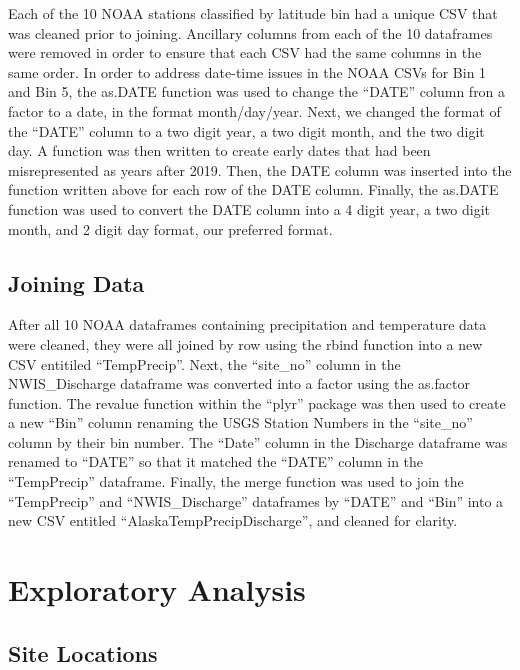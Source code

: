\documentclass[12pt,]{article}
\begin{document}
Each of the 10 NOAA stations classified by latitude bin had a unique CSV
that was cleaned prior to joining. Ancillary columns from each of the 10
dataframes were removed in order to ensure that each CSV had the same
columns in the same order. In order to address date-time issues in the
NOAA CSVs for Bin 1 and Bin 5, the as.DATE function was used to change
the ``DATE'' column fron a factor to a date, in the format
month/day/year. Next, we changed the format of the ``DATE'' column to a
two digit year, a two digit month, and the two digit day. A function was
then written to create early dates that had been misrepresented as years
after 2019. Then, the DATE column was inserted into the function written
above for each row of the DATE column. Finally, the as.DATE function was
used to convert the DATE column into a 4 digit year, a two digit month,
and 2 digit day format, our preferred format.

\hypertarget{joining-data}{%
\subsection{Joining Data}\label{joining-data}}

After all 10 NOAA dataframes containing precipitation and temperature
data were cleaned, they were all joined by row using the rbind function
into a new CSV entitiled ``TempPrecip''. Next, the ``site\_no'' column
in the NWIS\_Discharge dataframe was converted into a factor using the
as.factor function. The revalue function within the ``plyr'' package was
then used to create a new ``Bin'' column renaming the USGS Station
Numbers in the ``site\_no'' column by their bin number. The ``Date''
column in the Discharge dataframe was renamed to ``DATE'' so that it
matched the ``DATE'' column in the ``TempPrecip'' dataframe. Finally,
the merge function was used to join the ``TempPrecip'' and
``NWIS\_Discharge'' dataframes by ``DATE'' and ``Bin'' into a new CSV
entitled ``AlaskaTempPrecipDischarge'', and cleaned for clarity.

\newpage

\hypertarget{exploratory-analysis}{%
\section{Exploratory Analysis}\label{exploratory-analysis}}

\hypertarget{site-locations}{%
\subsection{Site Locations}\label{site-locations}}
\end{document}
